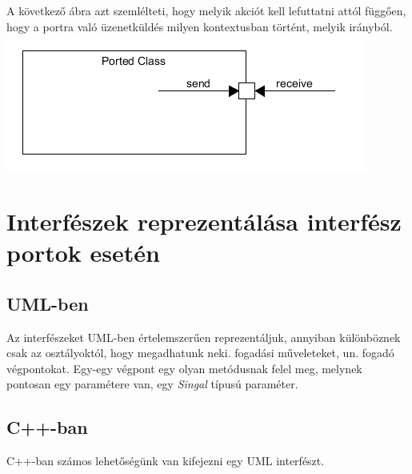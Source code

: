 \documentclass[a4paper,12pt]{report}
\begin{document}
A következő ábra azt szemlélteti, hogy melyik akciót kell lefuttatni attól függően, hogy a portra való üzenetküldés milyen kontextusban történt, melyik irányból. \\

\includegraphics[scale=0.8]{send_rec.png}

\section{Interfészek reprezentálása interfész portok esetén} \label{inf}
\subsection{UML-ben}
Az interfészeket UML-ben értelemszerűen reprezentáljuk, annyiban különböznek csak az osztályoktól, hogy megadhatunk neki. fogadási műveleteket, un. fogadó végpontokat. Egy-egy végpont egy olyan metódusnak felel meg, melynek pontosan egy paramétere van, egy \textit{Singal} típusú paraméter. 

\subsection{C++-ban}
C++-ban számos lehetőségünk van kifejezni egy UML interfészt.
\end{document}
